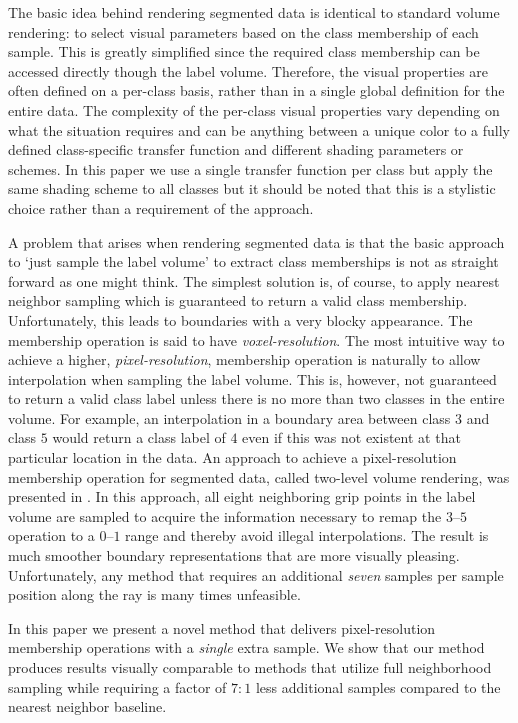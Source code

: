 \documentclass{egpubl}
\begin{document}
The basic idea behind rendering segmented data is identical to standard volume rendering: to select visual parameters based on the class membership of each sample. This is greatly simplified since the required class membership can be accessed directly though the label volume. Therefore, the visual properties are often defined on a per-class basis, rather than in a single global definition for the entire data. The complexity of the per-class visual properties vary depending on what the situation requires and can be anything between a unique color to a fully defined class-specific transfer function and different shading parameters or schemes. In this paper we use a single transfer function per class but apply the same shading scheme to all classes but it should be noted that this is a stylistic choice rather than a requirement of the approach.

A problem that arises when rendering segmented data is that the basic approach to `just sample the label volume' to extract class memberships is not as straight forward as one might think. The simplest solution is, of course, to apply nearest neighbor sampling which is guaranteed to return a valid class membership. Unfortunately, this leads to boundaries with a very blocky appearance. The membership operation is said to have \emph{voxel-resolution}. The most intuitive way to achieve a higher, \emph{pixel-resolution}, membership operation is naturally to allow interpolation when sampling the label volume. This is, however, not guaranteed to return a valid class label unless there is no more than two classes in the entire volume. For example, an interpolation in a boundary area between class $3$ and class $5$ would return a class label of $4$ even if this was not existent at that particular location in the data. An approach to achieve a pixel-resolution membership operation for segmented data, called two-level volume rendering, was presented in \cite{Hadwiger2003}. In this approach, all eight neighboring grip points in the label volume are sampled to acquire the information necessary to remap the $3$--$5$ operation to a $0$--$1$ range and thereby avoid illegal interpolations. The result is much smoother boundary representations that are more visually pleasing. Unfortunately, any method that requires an additional \emph{seven} samples per sample position along the ray is many times unfeasible.

In this paper we present a novel method that delivers pixel-resolution membership operations with a \emph{single} extra sample. We show that our method produces results visually comparable to methods that utilize full neighborhood sampling while requiring a factor of $7:1$ less additional samples compared to the nearest neighbor baseline.
\end{document}
